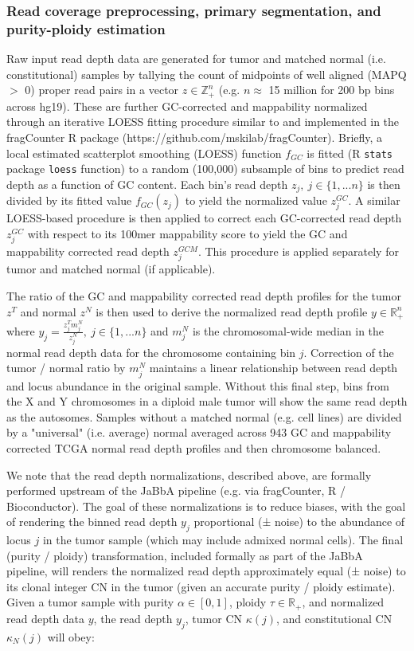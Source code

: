 \documentclass[phd,tocprelim]{cornell}
\newcommand{\ttt}[1]{\texttt{#1}}
\begin{document}
\subsubsection*{Read coverage preprocessing, primary segmentation, and purity-ploidy estimation}
Raw input read depth data are generated for tumor and matched normal (i.e. constitutional) samples by tallying the count of midpoints of well aligned (MAPQ $>$ 0) proper read pairs in a vector $z \in \mathbb{Z}^n_+$ (e.g. $n \approx$ 15 million for 200 bp bins across hg19).  These are further GC-corrected and mappability normalized through an iterative LOESS fitting procedure similar to \cite{Ha:2012kr} and implemented in the fragCounter R package (https://github.com/mskilab/fragCounter). Briefly, a local estimated scatterplot smoothing (LOESS) function $f_{GC}$ is fitted (R \ttt{stats} package \ttt{loess} function) to a random (100,000) subsample of bins to predict read depth as a function of GC content. Each bin's read depth $z_j,~j \in \{1, ... n\}$ is then divided by its fitted value $f_{GC}(z_j)$ to yield the normalized value $z^{GC}_j$.  A similar LOESS-based procedure is then applied to correct each GC-corrected read depth $z^{GC}_j$ with respect to its 100mer mappability score to yield the GC and mappability corrected read depth $z^{GCM}_j$.  This procedure is applied separately for tumor and matched normal (if applicable).

The ratio of the GC and mappability corrected read depth profiles for the tumor $z^T$ and normal $z^N$ is then used to derive the normalized read depth profile $y \in \mathbb{R}^n_+$ where $y_j = \frac{z_j^Tm_j^N}{z_j^N},~j \in \{1, ... n\}$ and $m^N_j$ is the chromosomal-wide median in the normal read depth data for the chromosome containing bin $j$.  Correction of the tumor / normal ratio by $m^N_j$ maintains a linear relationship between read depth and locus abundance in the original sample. Without this final step, bins from the X and Y chromosomes in a diploid male tumor will show the same read depth as the autosomes.  Samples without a matched normal (e.g. cell lines) are divided by a "universal" (i.e. average) normal averaged across 943 GC and mappability corrected TCGA normal read depth profiles and then chromosome balanced.


We note that the read depth normalizations, described above, are formally performed upstream of the JaBbA pipeline (e.g. via fragCounter, R / Bioconductor). The goal of these normalizations is to reduce biases, with the goal of rendering the binned read depth $y_j$ proportional (± noise) to the abundance of locus $j$ in the tumor sample (which may include admixed normal cells).  The final (purity / ploidy) transformation, included formally as part of the JaBbA pipeline, will renders the normalized read depth approximately equal (± noise) to its clonal integer CN in the tumor (given an accurate purity / ploidy estimate). Given a tumor sample with purity $\alpha \in [0, 1]$, ploidy $\tau \in \mathbb{R}_+$, and normalized read depth data $y$, the read depth $y_j$, tumor CN $\kappa(j)$, and constitutional CN $\kappa_N(j)$ will obey:
\end{document}
